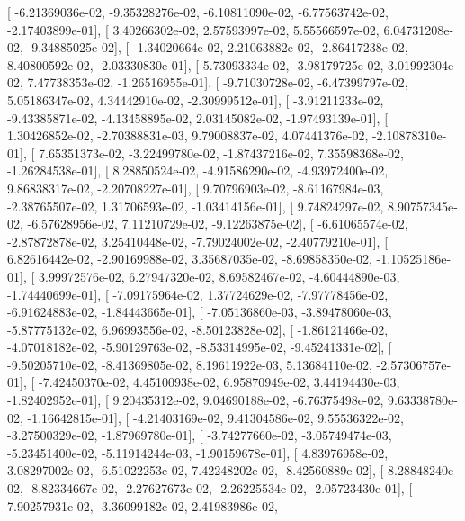 \documentclass{article}
\begin{document}
       [ -6.21369036e-02,  -9.35328276e-02,  -6.10811090e-02,
         -6.77563742e-02,  -2.17403899e-01],
       [  3.40266302e-02,   2.57593997e-02,   5.55566597e-02,
          6.04731208e-02,  -9.34885025e-02],
       [ -1.34020664e-02,   2.21063882e-02,  -2.86417238e-02,
          8.40800592e-02,  -2.03330830e-01],
       [  5.73093334e-02,  -3.98179725e-02,   3.01992304e-02,
          7.47738353e-02,  -1.26516955e-01],
       [ -9.71030728e-02,  -6.47399797e-02,   5.05186347e-02,
          4.34442910e-02,  -2.30999512e-01],
       [ -3.91211233e-02,  -9.43385871e-02,  -4.13458895e-02,
          2.03145082e-02,  -1.97493139e-01],
       [  1.30426852e-02,  -2.70388831e-03,   9.79008837e-02,
          4.07441376e-02,  -2.10878310e-01],
       [  7.65351373e-02,  -3.22499780e-02,  -1.87437216e-02,
          7.35598368e-02,  -1.26284538e-01],
       [  8.28850524e-02,  -4.91586290e-02,  -4.93972400e-02,
          9.86838317e-02,  -2.20708227e-01],
       [  9.70796903e-02,  -8.61167984e-03,  -2.38765507e-02,
          1.31706593e-02,  -1.03414156e-01],
       [  9.74824297e-02,   8.90757345e-02,  -6.57628956e-02,
          7.11210729e-02,  -9.12263875e-02],
       [ -6.61065574e-02,  -2.87872878e-02,   3.25410448e-02,
         -7.79024002e-02,  -2.40779210e-01],
       [  6.82616442e-02,  -2.90169988e-02,   3.35687035e-02,
         -8.69858350e-02,  -1.10525186e-01],
       [  3.99972576e-02,   6.27947320e-02,   8.69582467e-02,
         -4.60444890e-03,  -1.74440699e-01],
       [ -7.09175964e-02,   1.37724629e-02,  -7.97778456e-02,
         -6.91624883e-02,  -1.84443665e-01],
       [ -7.05136860e-03,  -3.89478060e-03,  -5.87775132e-02,
          6.96993556e-02,  -8.50123828e-02],
       [ -1.86121466e-02,  -4.07018182e-02,  -5.90129763e-02,
         -8.53314995e-02,  -9.45241331e-02],
       [ -9.50205710e-02,  -8.41369805e-02,   8.19611922e-03,
          5.13684110e-02,  -2.57306757e-01],
       [ -7.42450370e-02,   4.45100938e-02,   6.95870949e-02,
          3.44194430e-03,  -1.82402952e-01],
       [  9.20435312e-02,   9.04690188e-02,  -6.76375498e-02,
          9.63338780e-02,  -1.16642815e-01],
       [ -4.21403169e-02,   9.41304586e-02,   9.55536322e-02,
         -3.27500329e-02,  -1.87969780e-01],
       [ -3.74277660e-02,  -3.05749474e-03,  -5.23451400e-02,
         -5.11914244e-03,  -1.90159678e-01],
       [  4.83976958e-02,   3.08297002e-02,  -6.51022253e-02,
          7.42248202e-02,  -8.42560889e-02],
       [  8.28848240e-02,  -8.82334667e-02,  -2.27627673e-02,
         -2.26225534e-02,  -2.05723430e-01],
       [  7.90257931e-02,  -3.36099182e-02,   2.41983986e-02,
\end{document}
